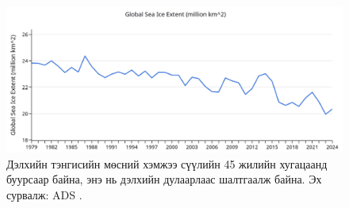 \documentclass[10pt,twocolumn,letterpaper]{article}
\begin{document}
\begin{figure}[t]
\begin{center}
\includegraphics[width=1\textwidth]{ice.jpg}

\end{center}
   \caption{Дэлхийн тэнгисийн мөсний хэмжээ сүүлийн 45 жилийн хугацаанд буурсаар байна, энэ нь дэлхийн дулаарлаас шалтгаалж байна. Эх сурвалж: ADS \cite{149}.}
\label{fig:24}
\end{figure}

\clearpage
\twocolumn

{\small
\renewcommand{\refname}{Ишлэлүүд}


}
\end{document}

